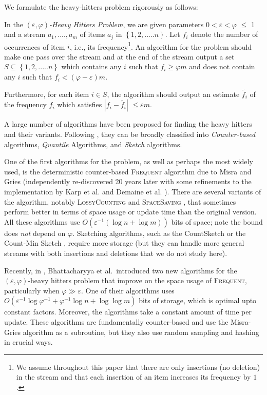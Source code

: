 \documentclass[sigconf,review=true,anonymous=true,screen]{acmart}
\newcommand{\eps}{\varepsilon}
\renewcommand{\phi}{\varphi}
\begin{document}
We formulate the heavy-hitters problem rigorously as follows:
\begin{definition}\label{def:hh}
    In the {\em $(\varepsilon, \varphi)$-Heavy Hitters Problem}, we are given
    parameters $0< \varepsilon <\varphi$ $\leqslant$ 1 and a stream $a_{1},....,a_{m}$
    of items $a_{j}$ in $\left\{1,2,.....n\right\}$. Let $f_{i}$ denote the number of
    occurrences of item $i$, i.e., its frequency\footnote{We assume throughout this paper that there are only insertions (no deletion) in the stream and that each insertion of an item increases its frequency by $1$. }. An algorithm for the problem should make one pass over the stream and at the end
    of the stream output a set $S \subseteq \left\{1,2,.....n\right\}$ which contains any $i$ such that $f_i \geq \phi m$ and does not contain any $i$ such that $f_i < (\phi - \eps)m$.
 
 Furthermore, for each item $i\in S$, the algorithm should output an estimate $\tilde{f_{i}}$ of the frequency $f_{i}$ which satisfies $|f_{i} -\tilde{f_{i}}|$ $ \leqslant \varepsilon m$. 
\end{definition}
    A large number of algorithms have been proposed for finding the heavy hitters and their variants. Following \cite{FrequentSurvey}, they can be broadly classified into {\em Counter-based} algorithms, {\em Quantile} Algorithms,  and {\em Sketch} algorithms. 

    One of the first algorithms for the problem, as well as perhaps the most widely used, is the deterministic counter-based \textsc{Frequent} algorithm  due to Misra and Gries \cite{MG82} (independently re-discovered 20 years later with some refinements to the implementation by Karp et al. \cite{KSP03} and Demaine et al. \cite{DLM02}). There are several variants of the algorithm, notably \textsc{LossyCounting} \cite{MM02} and \textsc{SpaceSaving} \cite{MAA05}, that sometimes perform better in terms of space usage or update time than the original version. All these algorithms use $O(\eps^{-1}(\log n + \log m))$ bits of space; note the bound does {\em not} depend on $\varphi$. Sketching algorithms, such as the CountSketch \cite{CCF02} or the Count-Min Sketch \cite{CM05}, require more storage (but they can handle more general streams with both insertions and deletions that we do not study here).
    
Recently, in \cite{BDW16}, Bhattacharyya et al.~introduced two new algorithms for the $(\eps, \phi)$-heavy hitters problem that improve on the space usage of \textsc{Frequent}, particularly when $\varphi \gg \eps$. One of their algorithms uses $O(\eps^{-1}\log\varphi^{-1}+\varphi^{-1} \log n + \log \log m)$ bits of storage, which is optimal upto constant factors. Moreover, the algorithms take a constant amount of time per update. These algorithms are fundamentally counter-based and use the Misra-Gries algorithm as a subroutine, but they also use random sampling and hashing in crucial ways.
\end{document}
